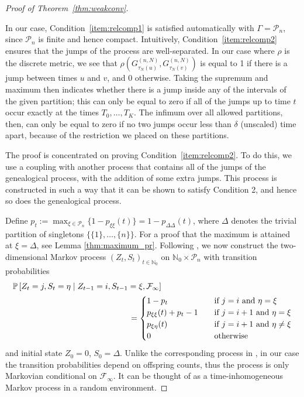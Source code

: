 \begin{proof}[Proof of Theorem~\ref{thm:weakconv}]
\begin{enumerate}
\end{enumerate}
In our case, Condition~\ref{item:relcomp1} is satisfied automatically with $\Gamma = \mathcal{P}_n$, since $\mathcal{P}_n$ is finite and hence compact. 
Intuitively, Condition~\ref{item:relcomp2} ensures that the jumps of the process are well-separated. 
In our case where $\rho$ is the discrete metric, we see that $\rho( G_{\tau_N(u)}^{(n,N)}, G_{\tau_N(v)}^{(n,N)} )$ is equal to 1 if there is a jump between times $u$ and $v$, and 0 otherwise.
Taking the supremum and maximum then indicates whether there is a jump inside any of the intervals of the given partition; this can only be equal to zero if all of the jumps up to time $t$ occur exactly at the times $T_0, \dots, T_K$. 
The infimum over all allowed partitions, then, can only be equal to zero if no two jumps occur less than $\delta$ (unscaled) time apart, because of the restriction we placed on these partitions.

The proof is concentrated on proving Condition~\ref{item:relcomp2}.
To do this, we use a coupling with another process that contains all of the jumps of the genealogical process, with the addition of some extra jumps. This process is constructed in such a way that it can be shown to satisfy Condition 2, and hence so does the genealogical process.

Define $p_t := \max_{\xi\in \mathcal{P}_n} \{1 - p_{\xi\xi}(t)\} = 1 - p_{\Delta\Delta}(t)$, where $\Delta$ denotes the trivial partition of singletons $\{ \{1\},\dots, \{n\} \}$. For a proof that the maximum is attained at $\xi = \Delta$, see Lemma \ref{thm:maximum_pr}. 
Following \textcite{mohle1999}, we now construct the two-dimensional Markov process $(Z_t, S_t)_{t \in \mathbb{N}_0}$ on $\mathbb{N}_0 \times \mathcal{P}_n$ with transition probabilities
\begin{align}
&\Prob\left[ Z_t = j , S_t = \eta \mid Z_{t-1} = i, S_{t-1} = \xi, \mathcal{F}_\infty \right] \notag\\
&\hspace{5cm}= \begin{cases}
1 - p_t &\quad \text{if } j=i \text{ and } \eta=\xi \\
p_{\xi\xi}(t) + p_t - 1  &\quad \text{if } j=i+1 \text{ and } \eta=\xi \\
p_{\xi\eta}(t) &\quad \text{if } j=i+1 \text{ and } \eta\neq\xi \\
0 &\quad \text{otherwise} 
\end{cases}
\label{eq:constructed_chain}
\end{align}
and initial state $Z_0=0$, $S_0 = \Delta$.
Unlike the corresponding process in \textcite{mohle1999}, in our case the transition probabilities depend on offspring counts, thus the process is only Markovian conditional on $\mathcal{F}_\infty$. It can be thought of as a time-inhomogeneous Markov process in a random environment.


\end{proof}
